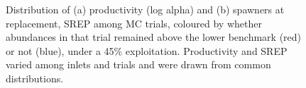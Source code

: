 \documentclass[11pt]{book}
\begin{document}
\begin{figure}[htb]

{\centering {} 

}

\caption{Distribution of (a) productivity (log alpha) and (b) spawners at replacement, SREP among MC trials, coloured by whether abundances in that trial remained above the lower benchmark (red) or not (blue), under a 45\% exploitation. Productivity and SREP varied among inlets and trials and were drawn from common distributions. }\label{fig:chinook-SRHistEven}
\end{figure}
\linebreak
\end{document}
